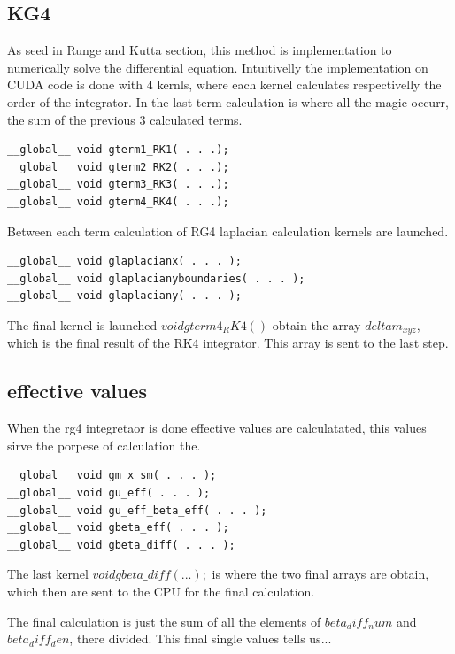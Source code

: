 \subsection{KG4}

As seed  in Runge and Kutta section, this method is implementation to numerically solve the differential equation. Intuitivelly the implementation on CUDA code is done with 4 kernls, where each kernel calculates respectivelly the order of the integrator. In the last term calculation is where all the magic occurr, the sum of the previous 3 calculated terms.

\begin{lstlisting}[frame=none]
__global__ void gterm1_RK1( . . .);
__global__ void gterm2_RK2( . . .);
__global__ void gterm3_RK3( . . .);
__global__ void gterm4_RK4( . . .);
\end{lstlisting}

Between each term calculation of RG4 laplacian calculation kernels are launched.

\begin{lstlisting}[frame=none]
__global__ void glaplacianx( . . . );
__global__ void glaplacianyboundaries( . . . );
__global__ void glaplaciany( . . . );
\end{lstlisting}

The final kernel is launched $void gterm4_RK4()$ obtain the array $deltam_{xyz}$, which is the final result of the RK4 integrator. This array is sent to the last step.

\subsection{effective values}

When the rg4 integretaor is done effective values are calculatated, this values sirve the porpese of calculation  the.


\begin{lstlisting}[frame=none]
__global__ void gm_x_sm( . . . );
__global__ void gu_eff( . . . );
__global__ void gu_eff_beta_eff( . . . );
__global__ void gbeta_eff( . . . );
__global__ void gbeta_diff( . . . );
\end{lstlisting}

The last kernel $ void gbeta\_diff( . . . );$ is where the two final arrays are obtain,
which then are sent to the CPU for the final calculation.

The final calculation is just the sum of all the elements of $beta_diff_num$ and $beta_diff_den$, there divided.
This final single values tells us...



